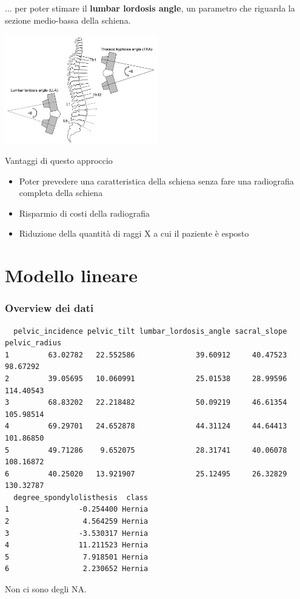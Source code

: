 \documentclass{beamer}
\begin{document}
\begin{frame}
    ... per poter stimare il \textbf{lumbar lordosis angle}, un parametro che riguarda la sezione medio-bassa della schiena.
    \begin{center}
        \includegraphics[width=0.5\textwidth]{lla.png}
    \end{center}
\end{frame}

\begin{frame}
    Vantaggi di questo approccio
    \begin{itemize}
        \item Poter prevedere una caratteristica della schiena senza fare una radiografia completa della schiena
        \item Risparmio di costi della radiografia
        \item Riduzione della quantità di raggi X a cui il paziente è esposto
    \end{itemize}
\end{frame}

\section{Modello lineare}
\begin{frame}[fragile]
\frametitle{Overview dei dati}
\tiny
	\begin{verbatim}
  pelvic_incidence pelvic_tilt lumbar_lordosis_angle sacral_slope pelvic_radius
1         63.02782   22.552586              39.60912     40.47523      98.67292
2         39.05695   10.060991              25.01538     28.99596     114.40543
3         68.83202   22.218482              50.09219     46.61354     105.98514
4         69.29701   24.652878              44.31124     44.64413     101.86850
5         49.71286    9.652075              28.31741     40.06078     108.16872
6         40.25020   13.921907              25.12495     26.32829     130.32787
  degree_spondylolisthesis  class
1                -0.254400 Hernia
2                 4.564259 Hernia
3                -3.530317 Hernia
4                11.211523 Hernia
5                 7.918501 Hernia
6                 2.230652 Hernia
	\end{verbatim}

	{\normalsize Non ci sono degli NA.}
\end{frame}
\end{document}
